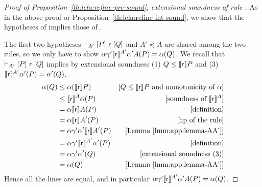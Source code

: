 \begin{proof}[Proof of Proposition~\ref{th:lcla:refine-pre-sound}, extensional soundness of rule ]
	As in the above proof or Proposition~\ref{th:lcla:refine-int-sound}, we show that the hypotheses of  implies those of .

	The first two hypotheses $\vdash_{A'}\nobreak[P]~\mathsf{r}~[Q]$ and $A' \preceq A$ are shared among the two rules, so we only have to show $\alpha \gamma' \llbracket\mathsf{r}\rrbracket^{A'} \alpha' A(P) = \alpha(Q)$. We recall that $\vdash_{A'}\nobreak[P]~\mathsf{r}~[Q]$ implies by extensional soundness (1) $Q \le \llbracket\mathsf{r}\rrbracket P$ and (3) $\llbracket\mathsf{r}\rrbracket^{A'} \alpha'(P) = \alpha'(Q)$.
	\begin{align*}
		\alpha(Q) & \le \alpha(\llbracket\mathsf{r}\rrbracket P )                   & [Q \le \llbracket\mathsf{r}\rrbracket P \text{ and monotonicity of }\alpha] \\
		          & \le \llbracket\mathsf{r}\rrbracket^{A} \alpha(P)                & [\text{soundness of }\llbracket\mathsf{r}\rrbracket^{A}]                    \\
		          & = \alpha \llbracket\mathsf{r}\rrbracket A(P)                    & [\text{definition}]                                        \\
		          & = \alpha \llbracket\mathsf{r}\rrbracket A'(P)                   & [\text{hp of the rule}]                                    \\
		          & = \alpha \gamma' \alpha' \llbracket\mathsf{r}\rrbracket A'(P)   & [\text{Lemma~\ref{lmm:app:lemma-AA'}}]                     \\
		          & = \alpha \gamma' \llbracket\mathsf{r}\rrbracket^{A'} \alpha'(P) & [\text{definition}]                                        \\
		          & = \alpha \gamma' \alpha'(Q)                    & [\text{extensional soundness (3)}]                         \\
		          & = \alpha(Q)                                    & [\text{Lemma~\ref{lmm:app:lemma-AA'}}]
	\end{align*}
	Hence all the lines are equal, and in particular $\alpha \gamma' \llbracket\mathsf{r}\rrbracket^{A'} \alpha' A(P) = \alpha(Q)$.
\end{proof}

